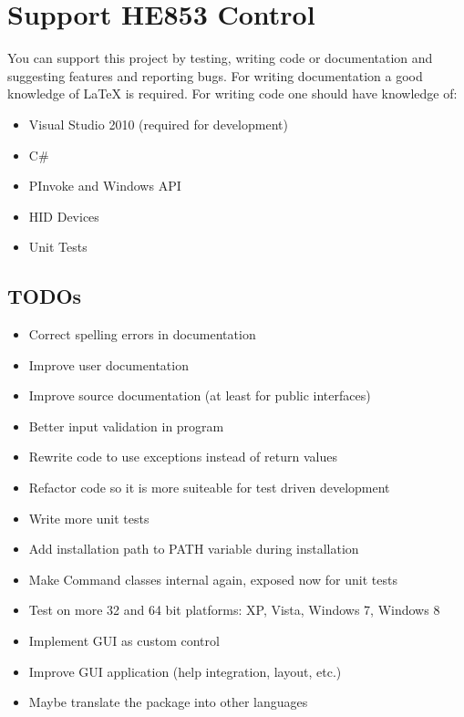 \documentclass[
a4paper,
oneside,
halfparskip*,
normalheadings,
]
{scrbook}
\begin{document}
\chapter{Support HE853 Control}

You can support this project by testing, writing code or documentation and suggesting features
and reporting bugs.
For writing documentation a good knowledge of LaTeX is required. For writing code one should
have knowledge of:

\begin{itemize}
	\item Visual Studio 2010 (required for development)
	\item C\#
	\item PInvoke and Windows API
	\item HID Devices
	\item Unit Tests
\end{itemize}

\section{TODOs}

\begin{itemize}
  \item Correct spelling errors in documentation
	\item Improve user documentation
	\item Improve source documentation (at least for public interfaces)
	\item Better input validation in program
	\item Rewrite code to use exceptions instead of return values
	\item Refactor code so it is more suiteable for test driven development
	\item Write more unit tests
	\item Add installation path to PATH variable during installation
	\item Make Command classes internal again, exposed now for unit tests
	\item Test on more 32 and 64 bit platforms: XP, Vista, Windows 7, Windows 8
	\item Implement GUI as custom control
	\item Improve GUI application (help integration, layout, etc.)
	\item Maybe translate the package into other languages
\end{itemize}
\end{document}
